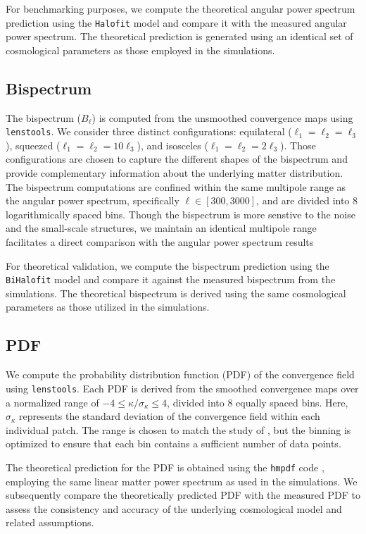 For benchmarking purposes, we compute the theoretical angular power spectrum prediction using the \texttt{Halofit} model \citep{2012ApJ...761..152T} and compare it with the measured angular power spectrum. 
The theoretical prediction is generated using an identical set of cosmological parameters as those employed in the simulations.

\subsection{Bispectrum}
The bispectrum ($B_{\ell}$) is computed from the unsmoothed convergence maps using \texttt{lenstools}. We consider three distinct configurations: equilateral ($\ell_1 = \ell_2 = \ell_3$), squeezed ($\ell_1 = \ell_2 = 10\ell_3$), and isosceles ($\ell_1 = \ell_2 = 2\ell_3$). 
Those configurations are chosen to capture the different shapes of the bispectrum and provide complementary information about the underlying matter distribution.
The bispectrum computations are confined within the same multipole range as the angular power spectrum, specifically $\ell \in [300, 3000]$, and are divided into $8$ logarithmically spaced bins. Though the bispectrum is more senstive to the noise and the small-scale structures, we maintain an identical multipole range facilitates a direct comparison with the angular power spectrum results

For theoretical validation, we compute the bispectrum prediction using the \texttt{BiHalofit} model \citep{2020ApJ...895..113T} and compare it against the measured bispectrum from the simulations. The theoretical bispectrum is derived using the same cosmological parameters as those utilized in the simulations.

\subsection{PDF}
We compute the probability distribution function (PDF) of the convergence field using \texttt{lenstools}. Each PDF is derived from the smoothed convergence maps over a normalized range of $-4 \leq \kappa/\sigma_{\kappa} \leq 4$, divided into 8 equally spaced bins. Here, $\sigma_{\kappa}$ represents the standard deviation of the convergence field within each individual patch. The range is chosen to match the study of \citet{2023arXiv230405928T}, but the binning is optimized to ensure that each bin contains a sufficient number of data points.

The theoretical prediction for the PDF is obtained using the \texttt{hmpdf} code \citep{2020PhRvD.102l3545T}, employing the same linear matter power spectrum as used in the simulations. We subsequently compare the theoretically predicted PDF with the measured PDF to assess the consistency and accuracy of the underlying cosmological model and related assumptions.

